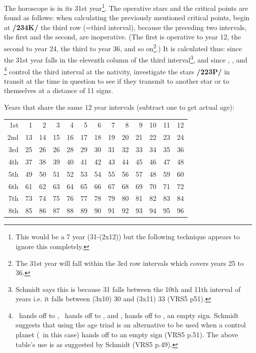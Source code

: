 The horoscope is in its 31st year\footnote{This would be a 7 year (31-(2x12)) but the following technique appears to ignore this completely.}. The operative stars and the critical points are found as follows: when calculating the previously mentioned critical points, begin at \textbf{/234K/} the third row (=third interval), because the preceding two intervals, the first and the second, are inoperative. (The first is operative to year 12, the second to year 24, the third to year 36, and so on\footnote{The 31st year will fall within the 3rd row intervals which covers years 25 to 36.}.) It is calculated thus: since the 31st year falls in the eleventh column of the third interval\footnote{Schmidt says this is because 31 falls between the 10th and 11th interval of years i.e. it falls between (3x10) 30 and (3x11) 33 (VRS5 p51).}, and since \Saturn, \Jupiter, and \Venus\footnote{\tiny\Saturn\, hands off to \Jupiter, \Jupiter\, hands off to \Venus, and \Venus, hands off to \Pisces, an empty sign.  Schmidt suggests that using the age triad is an alternative to be used when a control planet (\Venus\, in this case) hands off to an empty sign (VRS5 p.51). The above table's use is as suggested by Schmidt (VRS5 p.49).} control the third interval at the nativity, investigate the stars \textbf{/223P/} in transit at the time in question to see if they transmit to another star or to themselves at a distance of 11 signs. 
\begin{mdframed}[backgroundcolor=cyan!5]
\fontsize{7}{7}\selectfont
Years that share the same 12 year intervals (subtract one to get actual age):
\begin{longtable}[c]{r|rrrrrrrrrrrr}
\hline
1st 	& 1	& 2	& 3	& 4	& 5	& 6 
		& 7	& 8	& 9	& 10	& 11	& 12 \\
2nd	& 13 & 14 & 15 & 16 & 17 & 18 
		& 19 & 20 & 21 & 22 & 23 & 24 \\
3rd	& 25 & 26 & 26 & 28 & 29 & 30 
		& 31 & 32 & 33 & 34 & 35 & 36 \\ \hline
4th	& 37 & 38 & 39 & 40 & 41 & 42
		& 43 & 44 & 45 & 46 & 47 & 48 \\
5th 	& 49 & 50 & 51 & 52 & 53 & 54
		& 55 & 56 & 57 & 48 & 59 & 60 \\ 
6th	& 61 & 62 & 63 & 64 & 65 & 66 
		& 67 & 68 & 69 & 70 & 71 & 72 \\ \hline
7th	& 73 & 74 & 75 & 76 & 77 & 78
		& 79 & 80 & 81 & 82 & 83 & 84 \\
8th  & 85 & 86 & 87 & 88 & 89 & 90
		& 91 & 92 & 93 & 94 & 95 & 96 \\ \hline
\end{longtable}
\end{mdframed}

